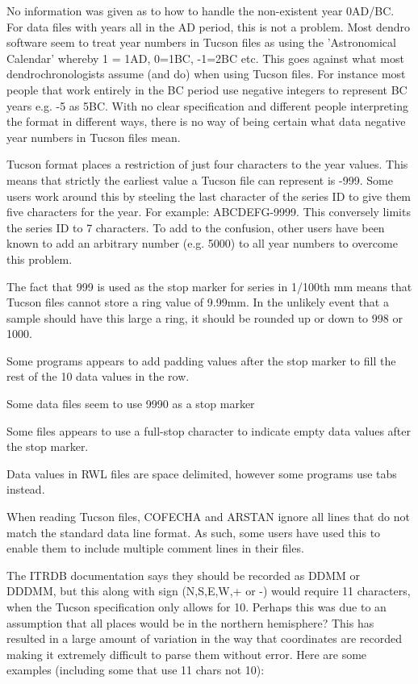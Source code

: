 \begin{itemize*}
\item  No information was given as to how to handle the non-existent year 0AD/BC. For data files with years all in the AD period, this is not a problem. Most dendro software seem to treat year numbers in Tucson files as using the 'Astronomical Calendar' whereby 1 = 1AD, 0=1BC, -1=2BC etc. This goes against what most dendrochronologists assume (and do) when using Tucson files. For instance most people that work entirely in the BC period use negative integers to represent BC years e.g. -5 as 5BC. With no clear specification and different people interpreting the format in different ways, there is no way of being certain what data negative year numbers in Tucson files mean.
\item Tucson format places a restriction of just four characters to the year values. This means that strictly the earliest value a Tucson file can represent is -999. Some users work around this by steeling the last character of the series ID to give them five characters for the year. For example: ABCDEFG-9999. This conversely limits the series ID to 7 characters. To add to the confusion, other users have been known to add an arbitrary number (e.g. 5000) to all year numbers to overcome this problem.
\item  The fact that 999 is used as the stop marker for series in 1/100th mm means that Tucson files cannot store a ring value of 9.99mm. In the unlikely event that a sample should have this large a ring, it should be rounded up or down to 998 or 1000.
\item  Some programs appears to add padding values after the stop marker to fill the rest of the 10 data values in the row.
\item  Some data files seem to use 9990 as a stop marker
\item  Some files appears to use a full-stop character to indicate empty data values after the stop marker.
\item  Data values in RWL files are space delimited, however some programs use tabs instead.
\item  When reading Tucson files, COFECHA and ARSTAN ignore all lines that do not match the standard data line format. As such, some users have used this to enable them to include multiple comment lines in their files.
\item  The ITRDB documentation says they should be recorded as DDMM or DDDMM, but this along with sign (N,S,E,W,+ or -) would require 11 characters, when the Tucson specification only allows for 10. Perhaps this was due to an assumption that all places would be in the northern hemisphere? This has resulted in a large amount of variation in the way that coordinates are recorded making it extremely difficult to parse them without error. Here are some examples (including some that use 11 chars not 10): 

\end{itemize*}
